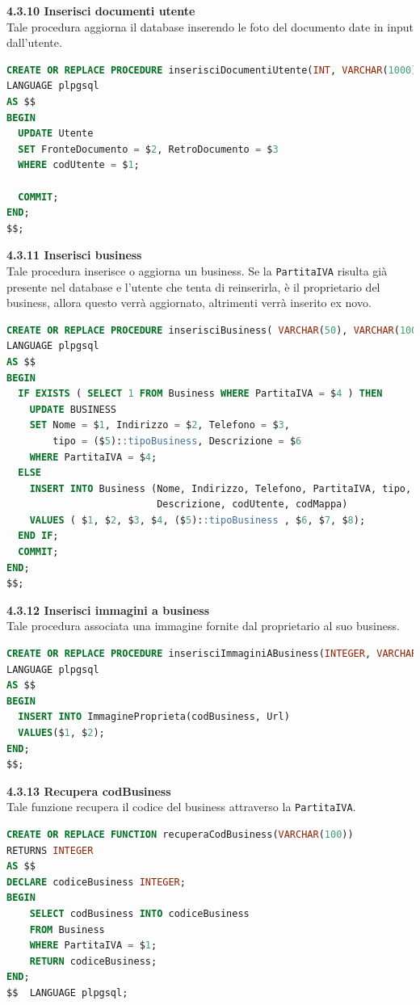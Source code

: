 \documentclass[a4paper,12pt]{article}
\begin{document}
\newpage\null{}\setcounter{page}{22}
\vspace{-2cm}
{\flushleft \bf 4.3.10  Inserisci documenti utente}\\
Tale procedura aggiorna il database inserendo le foto del documento date in input dall'utente.
\begin{lstlisting}[language=SQL]
CREATE OR REPLACE PROCEDURE inserisciDocumentiUtente(INT, VARCHAR(1000), VARCHAR(1000))
LANGUAGE plpgsql
AS $$
BEGIN
  UPDATE Utente
  SET FronteDocumento = $2, RetroDocumento = $3
  WHERE codUtente = $1;

  COMMIT;
END;
$$;
\end{lstlisting}

\vspace*{+1cm}

{\flushleft \bf 4.3.11  Inserisci business}\\
Tale procedura inserisce o aggiorna un business. Se la \verb|PartitaIVA| risulta già presente nel database e l'utente che tenta di reinserirla, è il proprietario del business, allora questo verrà aggiornato, altrimenti verrà inserito ex novo.
\begin{lstlisting}[language=SQL]
CREATE OR REPLACE PROCEDURE inserisciBusiness( VARCHAR(50), VARCHAR(100), VARCHAR(10), VARCHAR(100), VARCHAR(100), VARCHAR(2000), INTEGER, INTEGER)
LANGUAGE plpgsql
AS $$
BEGIN
  IF EXISTS ( SELECT 1 FROM Business WHERE PartitaIVA = $4 ) THEN
	UPDATE BUSINESS
	SET Nome = $1, Indirizzo = $2, Telefono = $3, 
	    tipo = ($5)::tipoBusiness, Descrizione = $6 
	WHERE PartitaIVA = $4;
  ELSE
	INSERT INTO Business (Nome, Indirizzo, Telefono, PartitaIVA, tipo, 
	                      Descrizione, codUtente, codMappa)
	VALUES ( $1, $2, $3, $4, ($5)::tipoBusiness , $6, $7, $8);
  END IF;
  COMMIT;
END;
$$;
\end{lstlisting}

\vspace*{+1cm}

{\flushleft \bf 4.3.12  Inserisci immagini a business}\\
Tale procedura associata una immagine fornite dal proprietario al suo business.
\begin{lstlisting}[language=SQL]
CREATE OR REPLACE PROCEDURE inserisciImmaginiABusiness(INTEGER, VARCHAR(1000))
LANGUAGE plpgsql
AS $$
BEGIN
  INSERT INTO ImmagineProprieta(codBusiness, Url)
  VALUES($1, $2);
END;
$$;
\end{lstlisting}
\newpage

\newpage\null{}\setcounter{page}{23}
\vspace{-2cm}
{\flushleft \bf 4.3.13  Recupera codBusiness}\\
Tale funzione recupera il codice del business attraverso la \verb|PartitaIVA|.
\begin{lstlisting}[language=SQL]
CREATE OR REPLACE FUNCTION recuperaCodBusiness(VARCHAR(100))
RETURNS INTEGER
AS $$
DECLARE codiceBusiness INTEGER;
BEGIN
	SELECT codBusiness INTO codiceBusiness
	FROM Business
	WHERE PartitaIVA = $1;
	RETURN codiceBusiness;
END;
$$  LANGUAGE plpgsql;
\end{lstlisting}
\end{document}
